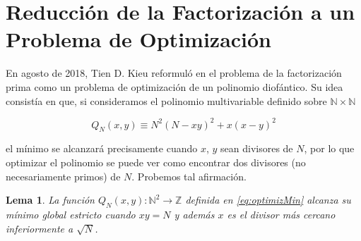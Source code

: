 \documentclass[11pt, spanish]{report}
\numberwithin{equation}{section}
\newtheorem{lema}[defin]{Lema}
\numberwithin{defin}{section}
\newenvironment{yellowBox}{\begin{tcolorbox}[colback=yellow!5!white,colframe=yellow!75!black]}{\end{tcolorbox}}
\begin{document}
\section{Reducción de la Factorización a un Problema de Optimización}

En agosto de 2018, Tien D. Kieu reformuló en \cite{2018arXiv180802781K} el problema de la factorización prima como un problema de optimización de un polinomio diofántico. Su idea consistía en que, si consideramos el polinomio multivariable definido sobre $\mathbb{N}\times\mathbb{N}$

\begin{equation}\label{eq:optimizMin}
Q_N(x,y)\equiv N^2(N-xy)^2+x(x-y)^2
\end{equation}

el mínimo se alcanzará precisamente cuando $x$, $y$ sean divisores de $N$, por lo que optimizar el polinomio se puede ver como encontrar dos divisores (no necesariamente primos) de $N$. Probemos tal afirmación.\\

\begin{yellowBox}
\begin{lema}
La función $Q_N(x,y):\mathbb{N}^2\rightarrow\mathbb{Z}$ definida en \ref{eq:optimizMin} alcanza su mínimo global estricto cuando $xy=N$ y además $x$ es el divisor más cercano inferiormente a $\sqrt{N}$.
\end{lema}
\end{yellowBox}
\end{document}
